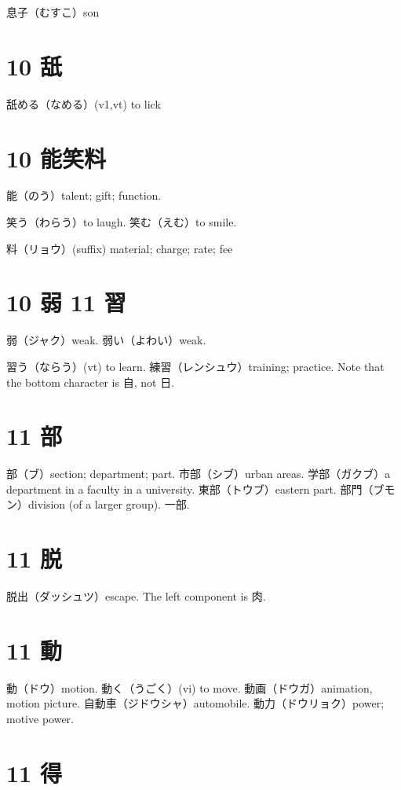 息子（むすこ）son

\section{10 舐}

舐める（なめる）(v1,vt) to lick

\section{10 能笑料}

能（のう）talent; gift; function.

笑う（わらう）to laugh.
笑む（えむ）to smile.

料（リョウ）(suffix) material; charge; rate; fee

\section{10 弱 11 習}

弱（ジャク）weak.
弱い（よわい）weak.

習う（ならう）(vt) to learn.
練習（レンシュウ）training; practice.
Note that the bottom character is 自, not 日.

\section{11 部}

部（ブ）section; department; part.
市部（シブ）urban areas.
学部（ガクブ）a department in a faculty in a university.
東部（トウブ）eastern part.
部門（ブモン）division (of a larger group).
一部.

\section{11 脱}

脱出（ダッシュツ）escape.
The left component is 肉.

\section{11 動}

動（ドウ）motion.
動く（うごく）(vi) to move.
動画（ドウガ）animation, motion picture.
自動車（ジドウシャ）automobile.
動力（ドウリョク）power; motive power.

\section{11 得}

